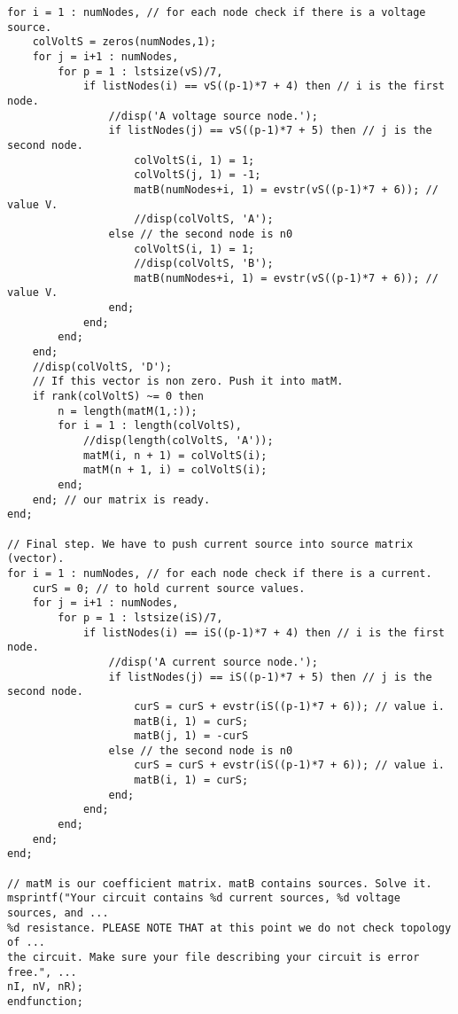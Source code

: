 \documentclass[a4paper,10pt]{article}
\begin{document}
\begin{verbatim}
for i = 1 : numNodes, // for each node check if there is a voltage source.
    colVoltS = zeros(numNodes,1);
    for j = i+1 : numNodes,
        for p = 1 : lstsize(vS)/7,
            if listNodes(i) == vS((p-1)*7 + 4) then // i is the first node.
                //disp('A voltage source node.');
                if listNodes(j) == vS((p-1)*7 + 5) then // j is the second node.
                    colVoltS(i, 1) = 1;
                    colVoltS(j, 1) = -1;
                    matB(numNodes+i, 1) = evstr(vS((p-1)*7 + 6)); // value V.
                    //disp(colVoltS, 'A');
                else // the second node is n0
                    colVoltS(i, 1) = 1;
                    //disp(colVoltS, 'B');
                    matB(numNodes+i, 1) = evstr(vS((p-1)*7 + 6)); // value V.
                end;
            end;
        end;
    end;
    //disp(colVoltS, 'D');
    // If this vector is non zero. Push it into matM.
    if rank(colVoltS) ~= 0 then
        n = length(matM(1,:));
        for i = 1 : length(colVoltS),
            //disp(length(colVoltS, 'A'));
            matM(i, n + 1) = colVoltS(i);
            matM(n + 1, i) = colVoltS(i);
        end;
    end; // our matrix is ready.
end;

// Final step. We have to push current source into source matrix (vector).
for i = 1 : numNodes, // for each node check if there is a current.
    curS = 0; // to hold current source values.
    for j = i+1 : numNodes,
        for p = 1 : lstsize(iS)/7,
            if listNodes(i) == iS((p-1)*7 + 4) then // i is the first node.
                //disp('A current source node.');
                if listNodes(j) == iS((p-1)*7 + 5) then // j is the second node.
                    curS = curS + evstr(iS((p-1)*7 + 6)); // value i.
                    matB(i, 1) = curS;
                    matB(j, 1) = -curS
                else // the second node is n0
                    curS = curS + evstr(iS((p-1)*7 + 6)); // value i.
                    matB(i, 1) = curS;
                end;
            end;
        end;
    end;
end;

// matM is our coefficient matrix. matB contains sources. Solve it.
msprintf("Your circuit contains %d current sources, %d voltage sources, and ...
%d resistance. PLEASE NOTE THAT at this point we do not check topology of ...
the circuit. Make sure your file describing your circuit is error free.", ...
nI, nV, nR);
endfunction;
\end{verbatim}
\end{document}
